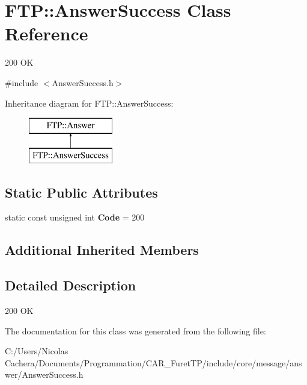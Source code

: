 \hypertarget{classFTP_1_1AnswerSuccess}{}\section{F\+T\+P\+:\+:Answer\+Success Class Reference}
\label{classFTP_1_1AnswerSuccess}


200 O\+K  




{\ttfamily \#include $<$Answer\+Success.\+h$>$}

Inheritance diagram for F\+T\+P\+:\+:Answer\+Success\+:\begin{figure}[H]
\begin{center}
\leavevmode
\includegraphics[height=2.000000cm]{classFTP_1_1AnswerSuccess}
\end{center}
\end{figure}
\subsection*{Static Public Attributes}
\begin{DoxyCompactItemize}
\item 
\hypertarget{classFTP_1_1AnswerSuccess_a3708e95f733d7e0d8aa62864113dc20b}{}static const unsigned int {\bfseries Code} = 200\label{classFTP_1_1AnswerSuccess_a3708e95f733d7e0d8aa62864113dc20b}

\end{DoxyCompactItemize}
\subsection*{Additional Inherited Members}


\subsection{Detailed Description}
200 O\+K 

The documentation for this class was generated from the following file\+:\begin{DoxyCompactItemize}
\item 
C\+:/\+Users/\+Nicolas Cachera/\+Documents/\+Programmation/\+C\+A\+R\+\_\+\+Furet\+T\+P/include/core/message/answer/Answer\+Success.\+h\end{DoxyCompactItemize}
